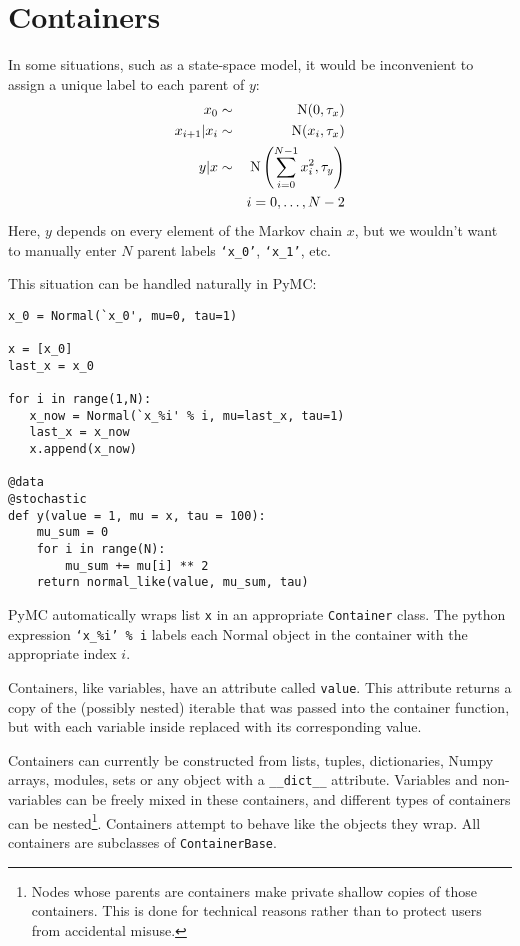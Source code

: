 \hypertarget{container}{}
\section*{Containers} \label{container}

In some situations, such as a state-space model, it would be inconvenient to assign a unique label to each parent of $y$:
\begin{eqnarray*}
    x_0 &\sim& \textup N(0,\tau_x)\\
    x_{i+1}|x_i &\sim& \textup{N}(x_i, \tau_x)\\
    y|x &\sim& \textup N\left(\sum_{i=0}^{N-1}x_i^2,\tau_y\right)\\
	&&i=0,\ldots, N-2
\end{eqnarray*}
Here, $y$ depends on every element of the Markov chain $x$, but we wouldn't want to manually enter $N$ parent labels \texttt{`x_0'}, \texttt{`x_1'}, etc.

This situation can be handled naturally in PyMC:
\begin{verbatim}
x_0 = Normal(`x_0', mu=0, tau=1)

x = [x_0]
last_x = x_0

for i in range(1,N):          
   x_now = Normal(`x_%i' % i, mu=last_x, tau=1)        
   last_x = x_now 
   x.append(x_now)

@data
@stochastic
def y(value = 1, mu = x, tau = 100):
    mu_sum = 0
    for i in range(N):
        mu_sum += mu[i] ** 2
    return normal_like(value, mu_sum, tau)
\end{verbatim}
PyMC automatically wraps list \texttt{x} in an appropriate \texttt{Container} class. The python expression \texttt{`x_\%i' \% i} labels each Normal object in the container with the appropriate index $i$.

Containers, like variables, have an attribute called \texttt{value}. This attribute returns a copy of the (possibly nested) iterable that was passed into the container function, but with each variable inside replaced with its corresponding value. 

Containers can currently be constructed from lists, tuples, dictionaries, Numpy arrays, modules, sets or any object with a \texttt{__dict__} attribute. Variables and non-variables can be freely mixed in these containers, and different types of containers can be nested\footnote{Nodes whose parents are containers make private shallow copies of those containers. This is done for technical reasons rather than to protect users from accidental misuse.}. Containers attempt to behave like the objects they wrap. All containers are subclasses of \texttt{ContainerBase}. 

